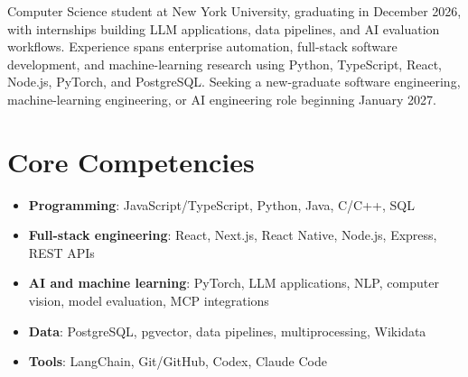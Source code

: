 \documentclass[11pt,a4paper,sans]{moderncv}
\begin{document}
\makecvtitle


\vspace{6pt}
\small{Computer Science student at New York University, graduating in December 2026, with internships building LLM applications, data pipelines, and AI evaluation workflows. Experience spans enterprise automation, full-stack software development, and machine-learning research using Python, TypeScript, React, Node.js, PyTorch, and PostgreSQL. Seeking a new-graduate software engineering, machine-learning engineering, or AI engineering role beginning January 2027.}


\section{Core Competencies}
\vspace{1pt}
\begin{itemize}

\item \textbf{Programming}: JavaScript/TypeScript, Python, Java, C/C++, SQL
\item \textbf{Full-stack engineering}: React, Next.js, React Native, Node.js, Express, REST APIs
\item \textbf{AI and machine learning}: PyTorch, LLM applications, NLP, computer vision, model evaluation, MCP integrations
\item \textbf{Data}: PostgreSQL, pgvector, data pipelines, multiprocessing, Wikidata
\item \textbf{Tools}: LangChain, Git/GitHub, Codex, Claude Code

\end{itemize}

\end{document}
